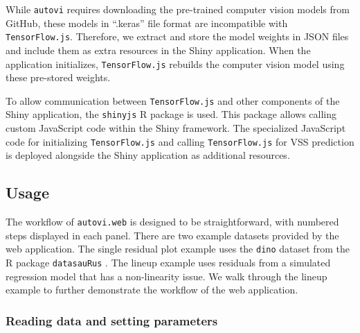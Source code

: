 \documentclass[
doublespace,
  times]{anzsauth}
\begin{document}
While \texttt{autovi} requires downloading the pre-trained computer
vision models from GitHub, these models in ``.keras'' file format are
incompatible with \texttt{TensorFlow.js}. Therefore, we extract and
store the model weights in JSON files and include them as extra
resources in the Shiny application. When the application initializes,
\texttt{TensorFlow.js} rebuilds the computer vision model using these
pre-stored weights.

To allow communication between \texttt{TensorFlow.js} and other
components of the Shiny application, the \texttt{shinyjs} R package
\citep{shinyjs} is used. This package allows calling custom JavaScript
code within the Shiny framework. The specialized JavaScript code for
initializing \texttt{TensorFlow.js} and calling \texttt{TensorFlow.js}
for VSS prediction is deployed alongside the Shiny application as
additional resources.

\subsection{Usage}\label{sec-autovi-web-workflow}

The workflow of \texttt{autovi.web} is designed to be straightforward,
with numbered steps displayed in each panel. There are two example
datasets provided by the web application. The single residual plot
example uses the \texttt{dino} dataset from the R package
\texttt{datasauRus} \citep{datasaurus}. The lineup example uses
residuals from a simulated regression model that has a non-linearity
issue. We walk through the lineup example to further demonstrate the
workflow of the web application.

\subsubsection{Reading data and setting
parameters}\label{reading-data-and-setting-parameters}
\end{document}
